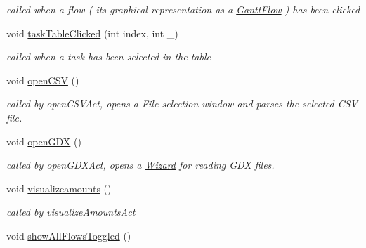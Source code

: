 \begin{DoxyCompactItemize}
\begin{DoxyCompactList}\small\item\em called when a flow ( its graphical representation as a \hyperlink{class_gantt_flow}{Gantt\+Flow} ) has been clicked \end{DoxyCompactList}\item 
\hypertarget{class_main_window_abacc539de6f25ca81a6b0543be799155}{}void \hyperlink{class_main_window_abacc539de6f25ca81a6b0543be799155}{task\+Table\+Clicked} (int index, int \+\_\+)\label{class_main_window_abacc539de6f25ca81a6b0543be799155}

\begin{DoxyCompactList}\small\item\em called when a task has been selected in the table \end{DoxyCompactList}\item 
\hypertarget{class_main_window_a580a35d29abc0a0c82edf183e7f87b74}{}void \hyperlink{class_main_window_a580a35d29abc0a0c82edf183e7f87b74}{open\+C\+S\+V} ()\label{class_main_window_a580a35d29abc0a0c82edf183e7f87b74}

\begin{DoxyCompactList}\small\item\em called by open\+C\+S\+V\+Act, opens a File selection window and parses the selected C\+S\+V file. \end{DoxyCompactList}\item 
\hypertarget{class_main_window_a23e9c749c8f0e5119317ea6484b9476f}{}void \hyperlink{class_main_window_a23e9c749c8f0e5119317ea6484b9476f}{open\+G\+D\+X} ()\label{class_main_window_a23e9c749c8f0e5119317ea6484b9476f}

\begin{DoxyCompactList}\small\item\em called by open\+G\+D\+X\+Act, opens a \hyperlink{class_wizard}{Wizard} for reading G\+D\+X files. \end{DoxyCompactList}\item 
\hypertarget{class_main_window_a631ac3f30fb6a0b0dc441739f0abe624}{}void \hyperlink{class_main_window_a631ac3f30fb6a0b0dc441739f0abe624}{visualizeamounts} ()\label{class_main_window_a631ac3f30fb6a0b0dc441739f0abe624}

\begin{DoxyCompactList}\small\item\em called by visualize\+Amounts\+Act \end{DoxyCompactList}\item 
\hypertarget{class_main_window_a36b4cda2f78374242c8fed56634dff90}{}void \hyperlink{class_main_window_a36b4cda2f78374242c8fed56634dff90}{show\+All\+Flows\+Toggled} ()\label{class_main_window_a36b4cda2f78374242c8fed56634dff90}


\end{DoxyCompactItemize}
